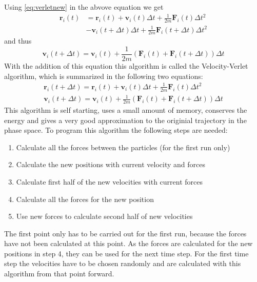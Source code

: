 \documentclass[12pt]{article}
\begin{document}
Using \eqref{eq:verletnew} in the abvove equation we get
\begin{equation}
    \begin{aligned}
        \mathbf{r}_i(t) &= \mathbf{r}_i(t) + \mathbf{v}_i(t) \Delta t + \frac1{2m}\mathbf{F}_i(t)\Delta t^2 \\
                     &- \mathbf{v}_i(t+\Delta t) \Delta t + \frac1{2m} \mathbf{F}_i(t+\Delta t) \Delta t^2
    \end{aligned}
\end{equation}
and thus
\begin{equation}
    \label{eq:vvelocities}
    \mathbf{v}_i(t+\Delta t) = \mathbf{v}_i(t) + \frac1{2m} \left(\mathbf{F}_i(t) + \mathbf{F}_i(t+\Delta t)\right) \Delta t
\end{equation}
With the addition of this equation this algorithm is called the Velocity-Verlet algorithm, which is summarized in the following two equations:
\begin{equation}
    \label{eq:velocityverlet}
    \begin{aligned}
        \mathbf{r}_i(t+\Delta t) = \mathbf{r}_i(t) + {\mathbf{v}}_i(t) \Delta t + \frac1{2m} {\mathbf{F}}_i(t) \Delta t^2\\
        \mathbf{v}_i(t+\Delta t) = \mathbf{v}_i(t) + \frac1{2m} \left(\mathbf{F}_i(t) + \mathbf{F}_i(t+\Delta t)\right) \Delta t
    \end{aligned}
\end{equation}
This algorithm is self starting, uses a small amount of memory, conserves the energy and gives a very good approximation to the originial trajectory
in the phase space. To program this algorithm the following steps are needed: 
\begin{enumerate}
    \item Calculate all the forces between the particles (for the first run only)
    \item Calculate the new positions with current velocity and forces
    \item Calculate first half of the new velocities with current forces
    \item Calculate all the forces for the new position
    \item Use new forces to calculate second half of new velocities
\end{enumerate}
The first point only has to be carried out for the first run, because the forces have not been calculated at this point. As the forces are calculated
for the new positions in step 4, they can be used for the next time step. For the first time step the velocities have to be chosen randomly and are 
calculated with this algorithm from that point forward.
\end{document}
